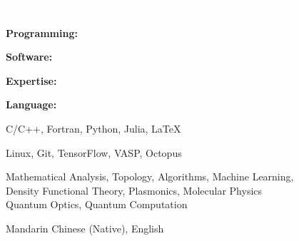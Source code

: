 \documentclass[12pt,a4paper,utf8]{report}
\begin{document}
\begin{minipage}[t]{16cm}
    \begin{snugshade}{\textcolor{white}{\textsf{\quad 
        EXPERTISE AND TECHNICAL STRENGTHS
    \qquad}}}\end{snugshade}
\end{minipage}\par
\vspace{0.2cm}
    \begin{minipage}[t]{4cm}
        \qquad \textbf{Programming:}\par
        \qquad \textbf{Software:}\par
        \qquad \textbf{Expertise:}\par
        \qquad \par
        \qquad \par
        \qquad \textbf{Language:}\par
    \end{minipage}
    \begin{minipage}[t]{11cm}
        C/C++, Fortran, Python, Julia, \LaTeX \par
        Linux, Git, TensorFlow, VASP, Octopus\par
        Mathematical Analysis, Topology, Algorithms, Machine Learning, \\
        Density Functional Theory, Plasmonics, Molecular Physics \\
        Quantum Optics, Quantum Computation \par
        Mandarin Chinese (Native), English \par
    \end{minipage}\par
\vspace{0.4cm}
\end{document}
